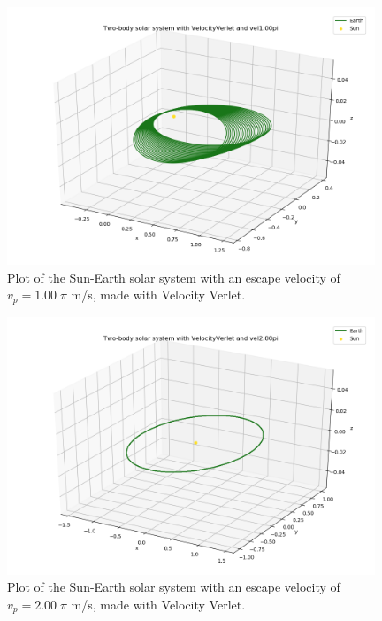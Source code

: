 \documentclass{article}
\begin{document}
    \begin{figure}[H]
        \centering
        \includegraphics[width = 11cm]{img/plot3D_S_E_V_vel100pi.png}
        \caption{Plot of the Sun-Earth solar system with an escape velocity of $v_p = 1.00 \; \pi$ m/s, made with Velocity Verlet. }
        \label{fig:plot3D_S_E_V_vel100pi}
    \end{figure}

    \begin{figure}[H]
        \centering
        \includegraphics[width = 11cm]{img/plot3D_S_E_V_vel200pi.png}
        \caption{Plot of the Sun-Earth solar system with an escape velocity of $v_p = 2.00 \; \pi$ m/s, made with Velocity Verlet. }
        \label{fig:plot3D_S_E_V_vel200pi}
    \end{figure}
\end{document}
